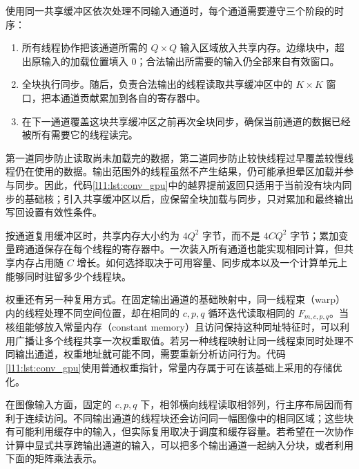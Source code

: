 使用同一共享缓冲区依次处理不同输入通道时，每个通道需要遵守三个阶段的时序：

\begin{enumerate}
  \item 所有线程协作把该通道所需的 $Q\times Q$ 输入区域放入共享内存。边缘块中，超出原输入的加载位置填入 $0$；合法输出所需要的输入仍全部来自有效窗口。
  \item 全块执行同步。随后，负责合法输出的线程读取共享缓冲区中的 $K\times K$ 窗口，把本通道贡献累加到各自的寄存器中。
  \item 在下一通道覆盖这块共享缓冲区之前再次全块同步，确保当前通道的数据已经被所有需要它的线程读完。
\end{enumerate}

第一道同步防止读取尚未加载完的数据，第二道同步防止较快线程过早覆盖较慢线程仍在使用的数据。输出范围外的线程虽然不产生结果，仍可能承担晕区加载并参与同步。因此，代码\ref{l11:lst:conv_gpu}中的越界提前返回只适用于当前没有块内同步的基础核；引入共享缓冲区以后，应保留全块加载与同步，只对累加和最终输出写回设置有效性条件。

按通道复用缓冲区时，共享内存大小约为 $4Q^2$ 字节，而不是 $4CQ^2$ 字节；累加变量跨通道保存在每个线程的寄存器中。一次装入所有通道也能实现相同计算，但共享内存占用随 $C$ 增长。如何选择取决于可用容量、同步成本以及一个计算单元上能够同时驻留多少个线程块。

权重还有另一种复用方式。在固定输出通道的基础映射中，同一线程束（warp）内的线程处理不同空间位置，却在相同的 $c,p,q$ 循环迭代读取相同的 $F_{m,c,p,q}$。当核组能够放入常量内存（constant memory）且访问保持这种同址特征时，可以利用广播让多个线程共享一次权重取值。若另一种线程映射让同一线程束同时处理不同输出通道，权重地址就可能不同，需要重新分析访问行为。代码\ref{l11:lst:conv_gpu}使用普通权重指针，常量内存属于可在该基础上采用的存储优化。

在图像输入方面，固定的 $c,p,q$ 下，相邻横向线程读取相邻列，行主序布局因而有利于连续访问。不同输出通道的线程块还会访问同一幅图像中的相同区域；这些块有可能利用缓存中的输入，但实际复用取决于调度和缓存容量。若希望在一次协作计算中显式共享跨输出通道的输入，可以把多个输出通道一起纳入分块，或者利用下面的矩阵乘法表示。
